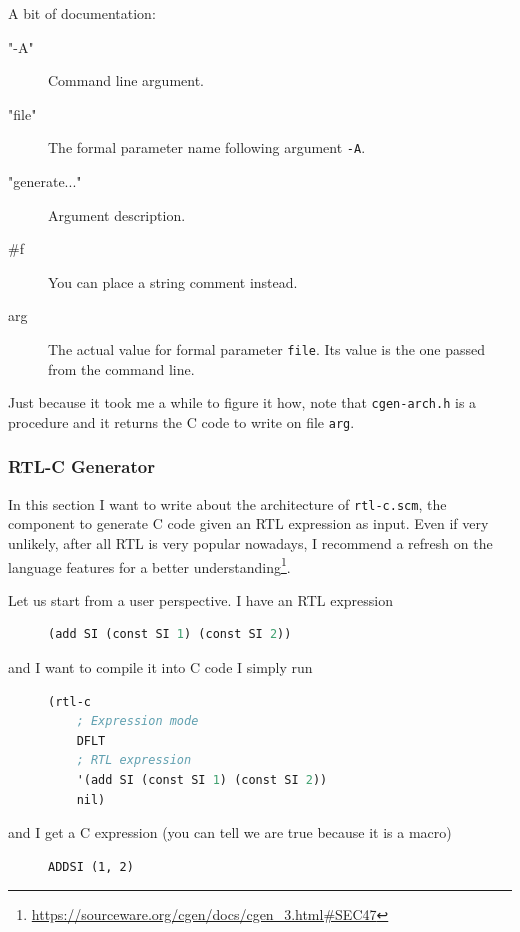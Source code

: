 \documentclass{article}
\begin{document}
A bit of documentation:
\begin{description}
\item["-A"] Command line argument.
\item["file"] The formal parameter name following argument \texttt{-A}.
\item["generate..."] Argument description.
\item[\#f] You can place a string comment instead.
\item[arg] The actual value for formal parameter \texttt{file}. Its value is the one passed from the command line.
\end{description}

Just because it took me a while to figure it how, note that \texttt{cgen-arch.h} is a procedure and it returns the C code to write on file \texttt{arg}.

\subsubsection{RTL-C Generator} \label{sec:rtl-c}
In this section I want to write about the architecture of \texttt{rtl-c.scm}, the component to generate C code given an RTL expression as input. Even if very unlikely, after all RTL is very popular nowadays, I recommend a refresh on the language features for a better understanding\footnote{\url{https://sourceware.org/cgen/docs/cgen_3.html\#SEC47}}.

Let us start from a user perspective. I have an RTL expression

\begin{figure}[H]
\begin{lstlisting}[language=Scheme]
(add SI (const SI 1) (const SI 2))
\end{lstlisting}
\end{figure}

and I want to compile it into C code I simply run 

\begin{figure}[H]
\begin{lstlisting}[language=Scheme]
(rtl-c
	; Expression mode
	DFLT
	; RTL expression
	'(add SI (const SI 1) (const SI 2))
	nil)
\end{lstlisting}
\end{figure}

and I get a C expression (you can tell we are true because it is a macro)

\begin{figure}[H]
\begin{lstlisting}
ADDSI (1, 2)
\end{lstlisting}
\end{figure}
\end{document}
